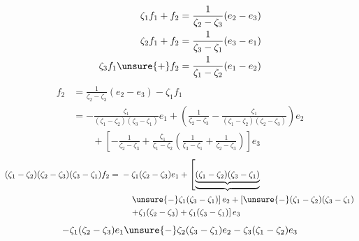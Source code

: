 \[
\begin{aligned}
\zeta_1f_1+f_2&=\frac1{\zeta_2-\zeta_3}(e_2-e_3)\\
\zeta_2f_1+f_2&=\frac1{\zeta_3-\zeta_1}(e_3-e_1)\\
\zeta_3f_1\unsure{+}f_2&=\frac1{\zeta_1-\zeta_2}(e_1-e_2)
\end{aligned}
\]
\[
\begin{aligned}
f_2&=\frac1{\zeta_2-\zeta_3}(e_2-e_3)-\zeta_1f_1\\
&=-\frac{\zeta_1}{(\zeta_1-\zeta_2)(\zeta_3-\zeta_1)}e_1+
\left(\frac1{\zeta_2-\zeta_3}-\frac{\zeta_1}{(\zeta_1-\zeta_2)(\zeta_2-\zeta_3)}\right)e_2\\
&\qquad+\left[-\frac1{\zeta_2-\zeta_3}
+\frac{\zeta_1}{\zeta_1-\zeta_2}
\left(\frac1{\zeta_3-\zeta_1}+\frac1{\zeta_2-\zeta_3}\right)\right]e_3
\end{aligned}
\]
\[
\begin{aligned}
(\zeta_1-\zeta_2)(\zeta_2-\zeta_3)(\zeta_3-\zeta_1)f_2
={}&-\zeta_1(\zeta_2-\zeta_3)e_1+
\left[\underbrace{\underbrace{(\zeta_1-\zeta_2)(\zeta_3-\zeta_1)}}\right.\\
&\left.\quad\unsure{-}\zeta_1(\zeta_3-\zeta_1)\right]e_2+
\left[\unsure{-}(\zeta_1-\zeta_2)(\zeta_3-\zeta_1)\right.\\
&\left.\quad+\zeta_1(\zeta_2-\zeta_3)+\zeta_1(\zeta_3-\zeta_1)\right]e_3
\end{aligned}
\]
\[
-\zeta_1(\zeta_2-\zeta_3)e_1
\unsure{-}\zeta_2(\zeta_3-\zeta_1)e_2
-\zeta_3(\zeta_1-\zeta_2)e_3
\]
